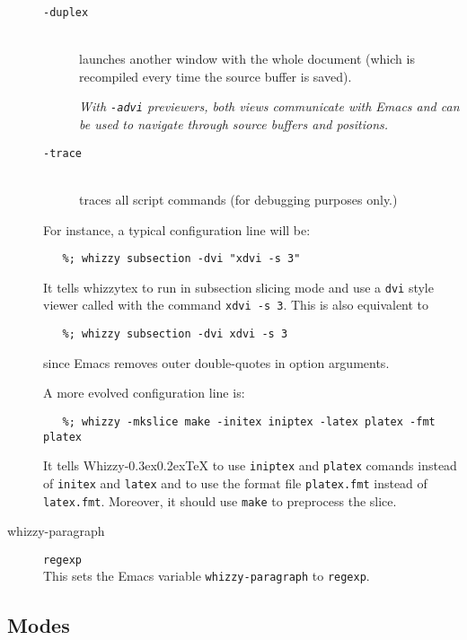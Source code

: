 \documentclass[12pt]{article}
\makeatletter
\let \lst \verb
\def \whizzy {{Whizzy\kern -0.3ex\raise 0.2ex\hbox{\let \@\relax\TeX}}}
\makeatother
\begin{document}
\begin{description}
\begin{description}
\item[\texttt{-duplex}]\indent\\
launches another window with the whole document (which is
recompiled every time the source buffer is saved).

{\em With \lst"-advi" previewers, both views  communicate with Emacs and can be
used to navigate through source buffers and positions.}

\item[\texttt{-trace}]\indent\\
traces all script commands (for debugging purposes only.)
\label{configuration.trace}

\end{description}

For instance, a typical configuration line will be:
\begin{verbatim}
   %; whizzy subsection -dvi "xdvi -s 3"
\end{verbatim}
It tells whizzytex to run in subsection slicing mode and use a \lst"dvi"
style viewer called with the command
\lst"xdvi -s 3". This is also equivalent to
\begin{verbatim}
   %; whizzy subsection -dvi xdvi -s 3
\end{verbatim}
since Emacs removes outer double-quotes in option arguments. 

A more evolved configuration line is:
\begin{verbatim}
   %; whizzy -mkslice make -initex iniptex -latex platex -fmt platex
\end{verbatim}
It tells {\whizzy} to use \lst"iniptex" and \lst"platex" comands instead
of \lst"initex" and \lst"latex" and to use the format file \lst"platex.fmt" 
instead of \lst"latex.fmt". Moreover, it should use \lst"make" to preprocess
the slice.

\item[whizzy-paragraph] \texttt{regexp}\\
This sets the Emacs variable \lst"whizzy-paragraph" to \texttt{regexp}.
\end{description} 


\subsection {Modes} 
\label {modes}
\end{document}
